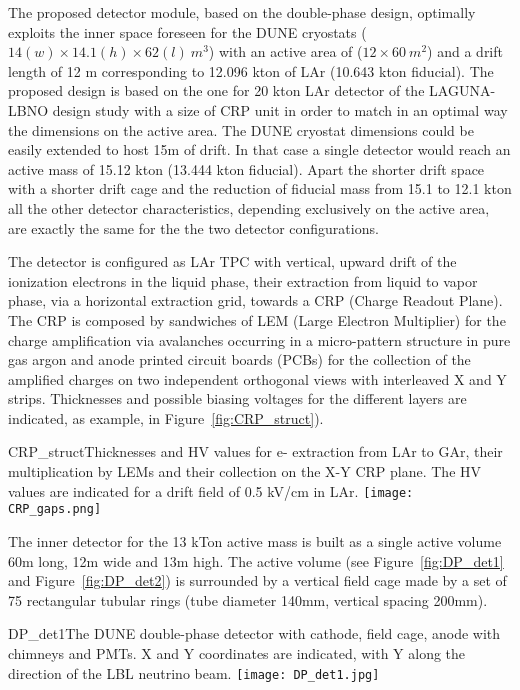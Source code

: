 The proposed detector module, based on the double-phase design, optimally exploits the inner space foreseen for the DUNE cryostats ($14 (w) \times 14.1 (h) \times 62  (l)~m^3$) with an active area of  ($12 \times 60 ~m^2$) and a drift length of 12 m corresponding to 12.096 kton of LAr (10.643 kton fiducial). The proposed design is based on the one for 20 kton LAr detector of the LAGUNA-LBNO design study with a size of CRP unit in order to match in an optimal way the dimensions on the active area. The DUNE cryostat dimensions could be easily extended to host 15m of drift. In that case a single detector would reach an active mass of 15.12 kton (13.444 kton fiducial).  Apart the shorter drift space with a shorter drift cage and the reduction of fiducial mass from 15.1 to 12.1 kton all the other detector characteristics, depending exclusively on the active area, are exactly the same for the the two detector configurations.

The detector is configured as LAr TPC with vertical, upward drift of the ionization electrons in the liquid phase, their extraction from liquid to vapor phase, via a horizontal extraction grid, towards a CRP (Charge Readout Plane). The CRP is composed by sandwiches of LEM (Large Electron Multiplier) for the charge amplification via avalanches occurring in a micro-pattern structure in pure gas argon and anode printed circuit boards (PCBs) for  the collection of the amplified charges on two independent orthogonal views with interleaved X and Y strips. Thicknesses and possible biasing voltages for the different layers are indicated, as example, in Figure~\ref{fig:CRP_struct}). 

\begin{cdrfigure}{CRP_struct}{Thicknesses and HV values for e- extraction from LAr to GAr, their multiplication by LEMs and their collection on the X-Y CRP plane. The HV values are indicated for a drift field of 0.5 kV/cm in LAr.}
\texttt{[image: CRP\_gaps.png]}
\end{cdrfigure}

The inner detector for the 13 kTon active mass is built as a single active volume 60m long, 12m wide and 13m high. The active volume (see Figure~\ref{fig:DP_det1} and Figure~\ref{fig:DP_det2}) is surrounded by a vertical field cage made by a set of 75 rectangular tubular rings (tube diameter 140mm, vertical spacing 200mm).

\begin{cdrfigure}{DP_det1}{The DUNE double-phase detector with cathode, field cage, anode with chimneys and PMTs. X and Y coordinates are indicated, with Y along the direction of the LBL neutrino beam.}
\texttt{[image: DP\_det1.jpg]}
\end{cdrfigure}

